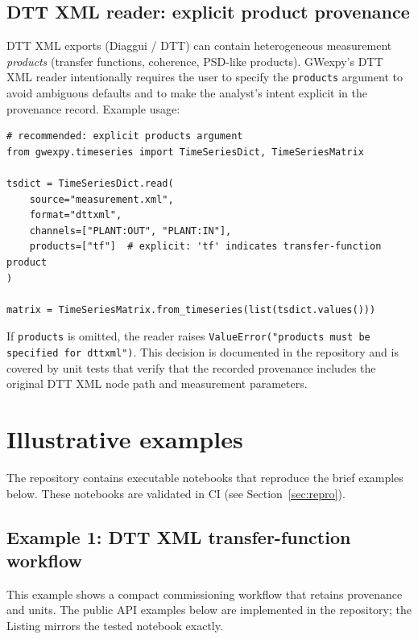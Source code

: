 \documentclass[preprint,12pt,a4paper]{elsarticle}
\begin{document}
\subsection{DTT XML reader: explicit product provenance}
\label{sec:dtt}
DTT XML exports (Diaggui / DTT) can contain heterogeneous measurement \emph{products} (transfer functions, coherence, PSD-like products).  GWexpy's DTT XML reader intentionally requires the user to specify the \texttt{products} argument to avoid ambiguous defaults and to make the analyst's intent explicit in the provenance record.  Example usage:

\begin{lstlisting}[caption={DTT XML: explicit product selection (public read API)}]
# recommended: explicit products argument
from gwexpy.timeseries import TimeSeriesDict, TimeSeriesMatrix

tsdict = TimeSeriesDict.read(
    source="measurement.xml",
    format="dttxml",
    channels=["PLANT:OUT", "PLANT:IN"],
    products=["tf"]  # explicit: 'tf' indicates transfer-function product
)

matrix = TimeSeriesMatrix.from_timeseries(list(tsdict.values()))
\end{lstlisting}

If \texttt{products} is omitted, the reader raises \texttt{ValueError("products must be specified for dttxml")}.  This decision is documented in the repository and is covered by unit tests that verify that the recorded provenance includes the original DTT XML node path and measurement parameters.

\section{Illustrative examples}
The repository contains executable notebooks that reproduce the brief examples below.  These notebooks are validated in CI (see Section~\ref{sec:repro}).

\subsection{Example 1: DTT XML \textrightarrow{} transfer-function workflow}
This example shows a compact commissioning workflow that retains provenance and units.  The public API examples below are implemented in the repository; the Listing mirrors the tested notebook exactly.
\end{document}
